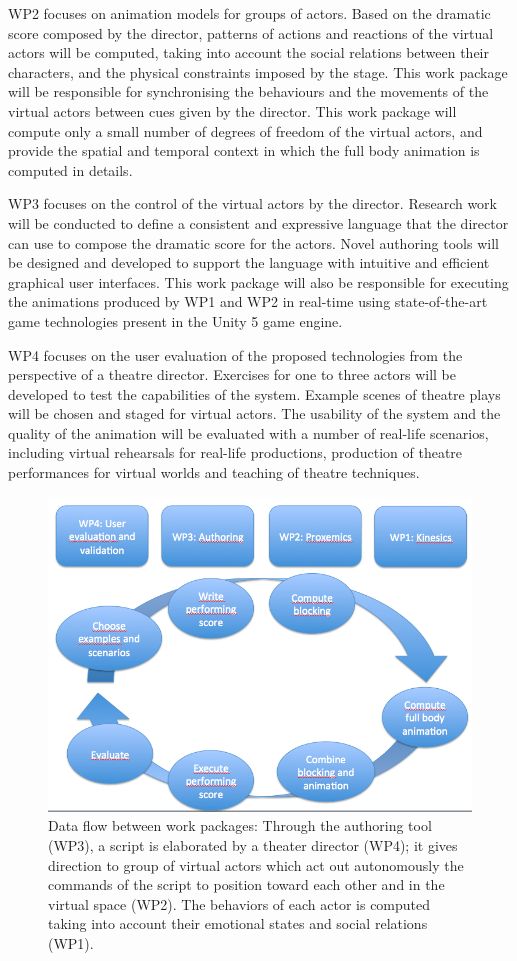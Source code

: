 WP2 focuses on animation models for groups of actors. Based on the dramatic score composed by the director, patterns of actions and reactions of the virtual actors will be computed, 
taking into account the social relations between their characters, and the physical constraints imposed by the stage. This work package will be responsible for synchronising the behaviours
and the movements of the virtual actors between cues given by the director.  This work package will compute only a small number of degrees of freedom of the virtual actors, and provide the spatial and temporal context in which the full body animation is computed in details.

WP3 focuses on the control of the virtual actors by the director. Research work will be conducted to define a consistent and expressive  language that the director can use to 
compose the dramatic score for the actors. Novel authoring tools will be designed and developed to support the language with intuitive and efficient graphical user interfaces. 
This work package will also be responsible for executing  the animations produced by WP1 and WP2 in real-time using state-of-the-art game technologies present in the Unity 5  game engine. 

WP4 focuses on the user evaluation of the proposed technologies from the perspective of a theatre director. Exercises for one to three actors will be developed to test 
the capabilities of the system. Example scenes of theatre plays will be chosen and staged for virtual actors. The usability of the system and the quality of the animation
will be evaluated with a number of real-life scenarios, including virtual rehearsals for real-life productions, production of theatre performances for virtual worlds and
teaching of theatre techniques.

\begin{figure}[htbp]
\begin{center}
\includegraphics[width=0.8\linewidth]{DADAWORKFLOW.png}
\caption{Data flow between work packages: Through the authoring tool (WP3), a script is elaborated by a theater director (WP4); it gives direction to group of virtual
actors which act out autonomously the commands of the script to position toward each other and in the virtual space (WP2). The behaviors of each actor is computed 
taking into account their emotional states and social relations (WP1).}
\label{default}
\end{center}
\end{figure}


\endinput